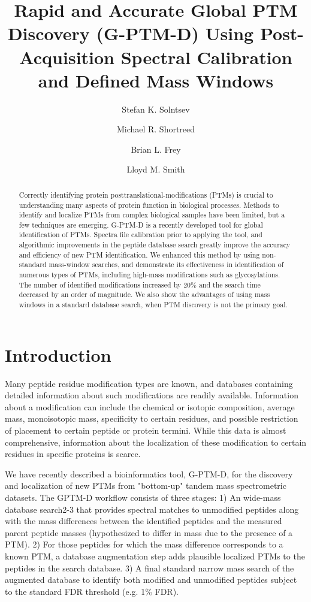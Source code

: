 \documentclass[journal=jprobs,manuscript=article]{achemso}
\author{Stefan K. Solntsev}
\author{Michael R. Shortreed}
\author{Brian L. Frey}
\author{Lloyd M. Smith}
\affiliation[UwMadison]
{University of Wisconsin-Madison}
\title[An \textsf{achemso} demo]
  {Rapid and Accurate Global PTM Discovery (G-PTM-D) Using Post-Acquisition Spectral Calibration and Defined Mass Windows}
\begin{document}
\begin{abstract}

Correctly identifying protein posttranslational-modifications (PTMs) is crucial to understanding many aspects of protein function in biological processes. Methods to identify and localize PTMs from complex biological samples have been limited, but a few techniques are emerging. G-PTM-D\cite{doi:10.1021/acs.jproteome.6b00034} is a recently developed tool for global identification of PTMs. Spectra file calibration prior to applying the tool, and algorithmic improvements in the peptide database search greatly improve the accuracy and efficiency of new PTM identification. We enhanced this method by using non-standard mass-window searches, and demonstrate its effectiveness in identification of numerous types of PTMs, including high-mass modifications such as glycosylations. The number of identified modifications increased by 20\% and the search time decreased by an order of magnitude. We also show the advantages of using mass windows in a standard database search, when PTM discovery is not the primary goal.
\end{abstract}

\section{Introduction}

Many peptide residue modification types are known, and databases containing detailed information about such modifications are readily available. Information about a modification can include the chemical or isotopic composition, average mass, monoisotopic mass, specificity to certain residues, and possible restriction of placement to certain peptide or protein termini. While this data is almost comprehensive, information about the localization of these modification to certain residues in specific proteins is scarce.

We have recently described a bioinformatics tool, G-PTM-D, for the discovery and localization of new PTMs from "bottom-up" tandem mass spectrometric datasets\cite{doi:10.1021/acs.jproteome.6b00034}. The GPTM-D workflow consists of three stages: 1) An wide-mass database search2-3 that provides spectral matches to unmodified peptides along with the mass differences between the identified peptides and the measured parent peptide masses (hypothesized to differ in mass due to the presence of a PTM).  2) For those peptides for which the mass difference corresponds to a known PTM, a database augmentation step adds plausible localized PTMs to the peptides in the search database. 3) A final standard narrow mass search of the augmented database to identify both modified and unmodified peptides subject to the standard FDR threshold (e.g. 1\% FDR). 
\end{document}
